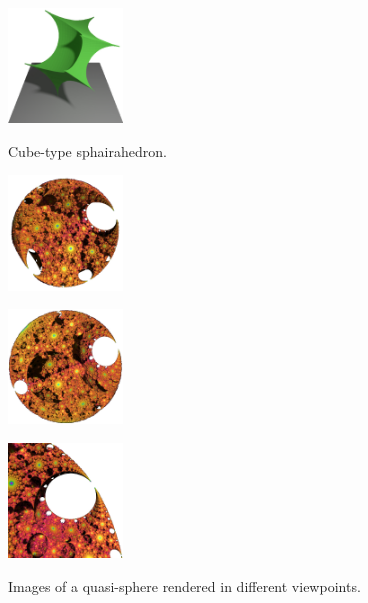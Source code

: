 \documentclass[suppldata, dvipdfmx]{interact}
\theoremstyle{plain}%
\theoremstyle{definition}
\theoremstyle{remark}
\theoremstyle{problemstyle}
\begin{document}
\begin{figure}[h!tbp]
  \begin{minipage}[t]{0.25\textwidth}
   \centering
   \includegraphics[height=1.2in, keepaspectratio]{./img/introduction/cube.jpg}
   \caption{Cube-type sphairahedron.}
   \label{fig:cubeSphaira}
  \end{minipage}
  \hspace*{\fill}
 \begin{minipage}[t]{0.75\textwidth}
  \begin{minipage}[t]{0.25\textwidth}
   \centering
   \includegraphics[height=1.2in,
   keepaspectratio]{./img/introduction/quasi-sphere.jpg}
   \subcaption{}
   \label{fig:quasi-sphere1}
  \end{minipage}
  \hspace*{\fill}
  \begin{minipage}[t]{0.25\textwidth}
   \centering
   \includegraphics[height=1.2in,
   keepaspectratio]{./img/introduction/other.jpg}
   \subcaption{}
   \label{fig:quasi-sphere2}
  \end{minipage}
  \hspace*{\fill}
  \begin{minipage}[t]{0.25\textwidth}
   \centering
   \includegraphics[height=1.2in,
   keepaspectratio]{./img/introduction/quasi-sphereZoom.jpg}
   \subcaption{}
   \label{fig:quasi-sphereZoom}
  \end{minipage}
  \hspace*{\fill}
  \caption{Images of a quasi-sphere rendered in different viewpoints.}
  \label{fig:quasi-sphere}
 \end{minipage}
\end{figure}
\end{document}
